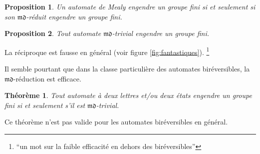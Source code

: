 \documentclass[11pt,a4paper]{article}
\newtheorem{prop}{Proposition}
\newtheorem{thm}{Théorème}
\begin{document}
\begin{prop}
  \label{prop:md-trivial}
  Un automate de Mealy engendre un groupe fini si et seulement si son $\mathfrak{md}$-réduit engendre un groupe fini.
\end{prop}

\begin{prop}
  Tout automate $\mathfrak{md}$-trivial engendre un groupe fini.
\end{prop}

La réciproque est fausse en général (voir figure \ref{fig:fantastiques}). \footnote{``un mot sur la faible efficacité en dehors des biréversibles''}

Il semble pourtant que dans la classe particulière des automates biréversibles, la $\mathfrak{md}$-réduction est efficace.

\begin{thm}{\cite{Klimann13}}
  \label{thm:K}
  Tout automate à deux lettres et/ou deux états engendre un groupe fini si et seulement s'il est $\mathfrak{md}$-trivial.
\end{thm}

Ce théorème n'est pas valide pour les automates biréversibles en général.
\newpage
\end{document}
